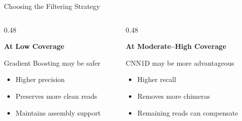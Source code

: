 \documentclass[aspectratio=169,11pt]{beamer}
\begin{document}
\begin{frame}{Choosing the Filtering Strategy}

\vspace{0.20cm}

\begin{columns}[T,onlytextwidth]


\begin{column}{0.48\textwidth}

{\large\color{mitoblue}\textbf{At Low Coverage}}

\vspace{0.18cm}

\begin{block}{Gradient Boosting may be safer}

\small

\begin{itemize}
    \setlength{\itemsep}{6pt}

    \item Higher precision
    \item Preserves more clean reads
    \item Maintains assembly support

\end{itemize}

\end{block}

\end{column}



\begin{column}{0.48\textwidth}

{\large\color{mitoblue}\textbf{At Moderate--High Coverage}}

\vspace{0.18cm}

\begin{block}{CNN1D may be more advantageous}

\small

\begin{itemize}
    \setlength{\itemsep}{6pt}

    \item Higher recall
    \item Removes more chimeras
    \item Remaining reads can compensate

\end{itemize}

\end{block}

\end{column}

\end{columns}

\end{frame}
\end{document}
